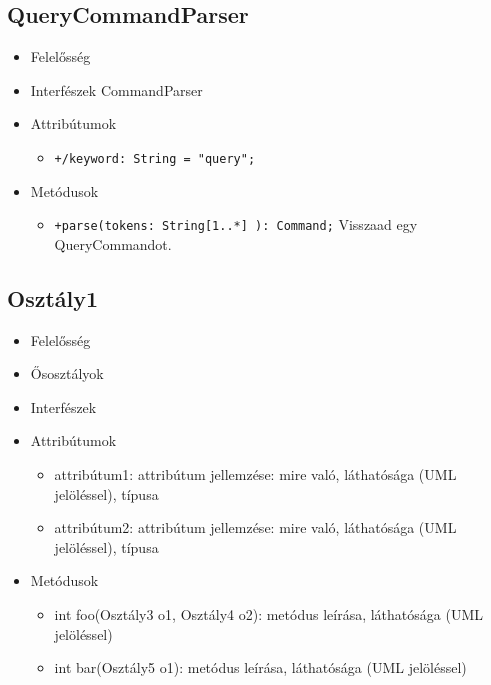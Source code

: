 \subsection{QueryCommandParser}
\begin{itemize}
\item Felelősség\newline
\item Interfészek\newline
CommandParser
\item Attribútumok
	\begin{itemize}
		\item \texttt{+/keyword: String = "query";}
	\end{itemize}
\item Metódusok
\begin{itemize}
		\item \texttt{+parse(tokens: String[1..*] ): Command;}
		Visszaad egy QueryCommandot.
	\end{itemize}
\end{itemize}

\subsection{Osztály1}
\begin{itemize}
\item Felelősség\newline
{}
\item Ősosztályok\newline
{}
\item Interfészek\newline
{}
\item Attribútumok\newline
{}
	\begin{itemize}
		\item attribútum1: attribútum jellemzése: mire való, láthatósága (UML jelöléssel), típusa
		\item attribútum2: attribútum jellemzése: mire való, láthatósága (UML jelöléssel), típusa
	\end{itemize}
\item Metódusok\newline
{}
	\begin{itemize}
		\item int foo(Osztály3 o1, Osztály4 o2): metódus leírása, láthatósága (UML jelöléssel)
		\item int bar(Osztály5 o1): metódus leírása, láthatósága (UML jelöléssel)
	\end{itemize}
\end{itemize}


